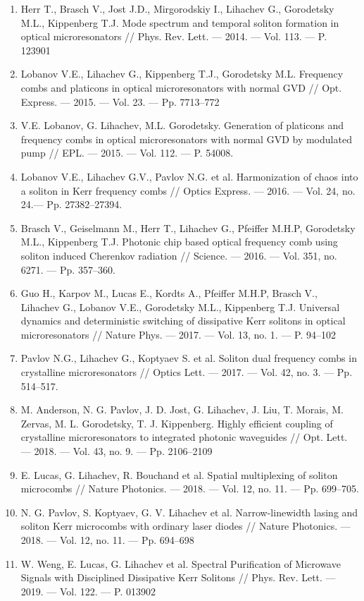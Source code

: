 {    \begin{enumerate}
  \item Herr T., Brasch V., Jost J.D., Mirgorodskiy I., Lihachev G., Gorodetsky M.L., Kippenberg T.J. Mode spectrum and temporal soliton formation in optical microresonators // Phys. Rev. Lett. — 2014. — Vol. 113. — P. 123901
  \item Lobanov V.E., Lihachev G., Kippenberg T.J., Gorodetsky M.L. Frequency combs and platicons in optical microresonators with normal GVD // Opt. Express. — 2015. — Vol. 23. — Pp. 7713–772
  \item V.E. Lobanov, G. Lihachev, M.L. Gorodetsky. Generation of platicons and frequency combs in optical microresonators with normal GVD by modulated pump // EPL. — 2015. — Vol. 112. — P. 54008.
  \item Lobanov V.E., Lihachev G.V., Pavlov N.G. et al. Harmonization of chaos into a soliton in Kerr frequency combs // Optics Express. — 2016. — Vol. 24, no. 24.— Pp. 27382–27394.
  \item Brasch V., Geiselmann M., Herr T., Lihachev G., Pfeiffer M.H.P, Gorodetsky M.L., Kippenberg T.J. Photonic chip based optical frequency comb using soliton induced Cherenkov radiation // Science. — 2016. — Vol. 351, no. 6271. — Pp. 357–360.
  \item Guo H., Karpov M., Lucas E., Kordts A., Pfeiffer M.H.P, Brasch V., Lihachev G., Lobanov V.E., Gorodetsky M.L., Kippenberg T.J. Universal dynamics and deterministic switching of dissipative Kerr solitons in optical microresonators // Nature Phys. — 2017. — Vol. 13, no. 1. — P. 94–102
  \item Pavlov N.G., Lihachev G., Koptyaev S. et al. Soliton dual frequency combs in crystalline microresonators // Optics Lett. — 2017. — Vol. 42, no. 3. — Pp. 514–517.
  \item M. Anderson, N. G. Pavlov, J. D. Jost, G. Lihachev, J. Liu, T. Morais, M. Zervas, M. L. Gorodetsky, T. J. Kippenberg. Highly efficient coupling of crystalline microresonators to integrated photonic waveguides // Opt. Lett. — 2018. — Vol. 43, no. 9. — Pp. 2106–2109
  \item E. Lucas, G. Lihachev, R. Bouchand et al. Spatial multiplexing of soliton microcombs // Nature Photonics. — 2018. — Vol. 12, no. 11. — Pp. 699–705.
  \item N. G. Pavlov, S. Koptyaev, G. V. Lihachev et al. Narrow-linewidth lasing and soliton Kerr microcombs with ordinary laser diodes // Nature Photonics. — 2018. — Vol. 12, no. 11. — Pp. 694–698
  \item W. Weng, E. Lucas, G. Lihachev et al.  Spectral Purification of Microwave Signals with Disciplined Dissipative Kerr Solitons // Phys. Rev. Lett. — 2019. — Vol. 122. — P. 013902
    \end{enumerate}


}
